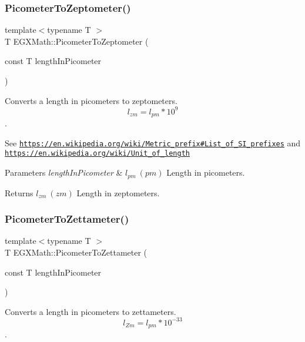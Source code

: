 \subsubsection{\texorpdfstring{Picometer\+To\+Zeptometer()}{PicometerToZeptometer()}}
{\footnotesize\ttfamily template$<$typename T $>$ \\
T E\+G\+X\+Math\+::\+Picometer\+To\+Zeptometer (\begin{DoxyParamCaption}\item[{const T}]{length\+In\+Picometer }\end{DoxyParamCaption})}



Converts a length in picometers to zeptometers. \[ l_{zm}=l_{pm} * 10^{9} \]. 

See \href{https://en.wikipedia.org/wiki/Metric_prefix#List_of_SI_prefixes}{\tt https\+://en.\+wikipedia.\+org/wiki/\+Metric\+\_\+prefix\#\+List\+\_\+of\+\_\+\+S\+I\+\_\+prefixes} and \href{https://en.wikipedia.org/wiki/Unit_of_length}{\tt https\+://en.\+wikipedia.\+org/wiki/\+Unit\+\_\+of\+\_\+length} 
\begin{DoxyParams}{Parameters}
{\em length\+In\+Picometer} & $ l_{pm}\ (pm)$ Length in picometers. \\
\hline
\end{DoxyParams}
\begin{DoxyReturn}{Returns}
$ l_{zm}\ (zm)$ Length in zeptometers. 
\end{DoxyReturn}
\mbox{\label{group___e_g_x_math-_conversions-_length_conversions-_s_i-_picometer-_s_i_gae3d104d5bddc3f76d951fb0c86aa31ca}} 
\subsubsection{\texorpdfstring{Picometer\+To\+Zettameter()}{PicometerToZettameter()}}
{\footnotesize\ttfamily template$<$typename T $>$ \\
T E\+G\+X\+Math\+::\+Picometer\+To\+Zettameter (\begin{DoxyParamCaption}\item[{const T}]{length\+In\+Picometer }\end{DoxyParamCaption})}



Converts a length in picometers to zettameters. \[ l_{Zm}=l_{pm} * 10^{-33} \]. 

